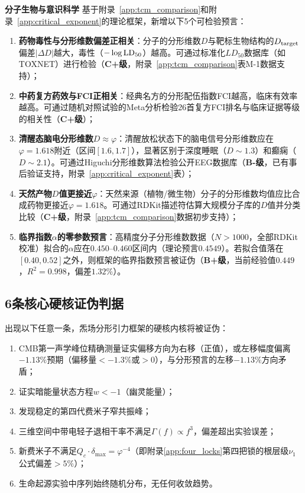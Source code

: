 \documentclass[12pt,a4paper,twocolumn]{article}
\renewcommand{\phi}{\varphi}
\begin{document}
\textbf{分子生物与意识科学}
基于附录~\ref{app:tcm_comparison}和附录~\ref{app:critical_exponent}的理论框架，新增以下5个可检验预言：
\begin{enumerate}
\item \textbf{药物毒性与分形维数偏差正相关}：分子的分形维数$D$与靶标生物结构的$D_{\rm target}$偏差$|\Delta D|$越大，毒性（$-\log {\rm LD}_{50}$）越高。可通过标准化$LD_{50}$数据库（如TOXNET）进行检验（\textbf{C+级}，附录~\ref{app:tcm_comparison}表M-1数据支持）；
\item \textbf{中药复方药效与FCI正相关}：经典名方的分形配伍指数FCI越高，临床有效率越高。可通过随机对照试验的Meta分析检验26首复方FCI排名与临床证据等级的相关性（\textbf{C+级}）；
\item \textbf{清醒态脑电分形维数$D \approx \phi$}：清醒放松状态下的脑电信号分形维数应在$\phi = 1.618$附近（区间$[1.6, 1.7]$），显著区别于深度睡眠（$D \sim 1.3$）和癫痫（$D \sim 2.1$）。可通过Higuchi分形维数算法检验公开EEG数据库（\textbf{B-级}，已有事后验证支持，附录~\ref{app:critical_exponent}表）；
\item \textbf{天然产物$D$值更接近$\phi$}：天然来源（植物/微生物）分子的分形维数均值应比合成药物更接近$\phi = 1.618$。可通过RDKit描述符估算大规模分子库的$D$值并分类比较（\textbf{C+级}，附录~\ref{app:tcm_comparison}数据初步支持）；
\item \textbf{临界指数$\alpha$的零参数预言}：高精度分子分形维数数据（$N > 1000$，全部RDKit校准）拟合的$\alpha$应在$0.450$--$0.460$区间内（理论预言$0.4549$）。若拟合值落在$[0.40, 0.52]$之外，则框架的临界指数预言被证伪（\textbf{B+级}，当前经验值$0.449$，$R^2=0.998$，偏差$1.32\%$）。
\end{enumerate}

\subsection{6条核心硬核证伪判据}
出现以下任意一条，炁场分形引力框架的硬核内核将被证伪：
\begin{enumerate}
\item CMB第一声学峰位精确测量证实偏移方向为右移（正值），或左移幅度偏离$-1.13\%$预期（偏移量$<-1.3\%$或$>0$），与分形预言的左移$-1.13\%$方向矛盾；
\item 证实暗能量状态方程$w < -1$（幽灵能量）；
\item 发现稳定的第四代费米子窄共振峰；
\item 三维空间中带电轻子退相干率不满足$\Gamma(f) \propto f^3$，偏差超出实验误差；
\item 新费米子不满足$Q_c \cdot \delta_{\max} = \phi^{-4}$（即附录\ref{app:four_locks}第四把锁的根层级$\nu_1$公式偏差$>5\%$）；
\item 生命起源实验中序列始终随机分布，无任何收敛趋势。
\end{enumerate}
\end{document}
